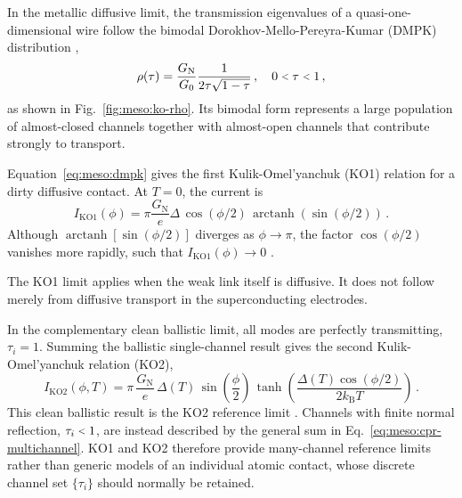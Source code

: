             In the metallic diffusive limit, the transmission eigenvalues of a quasi-one-dimensional wire follow the bimodal Dorokhov-Mello-Pereyra-Kumar (DMPK) distribution \cite{dorokhov_transmission_1982,beenakker_random-matrix_1997},
            \begin{equation}
                \rho(\tau) = \frac{G_\mathrm{N}}{G_0} \frac{1}{2\tau \sqrt{1-\tau}}\,,\quad 0\slt{}\tau\slt{}1\,,
                \label{eq:meso:dmpk}
            \end{equation}
            as shown in Fig.~\ref{fig:meso:ko-rho}. Its bimodal form represents a large population of almost-closed channels together with almost-open channels that contribute strongly to transport.

            Equation~\eqref{eq:meso:dmpk} gives the first Kulik-Omel'yanchuk (KO1) relation for a dirty diffusive contact. At $T=0$, the current is
            \begin{equation}
                I_\mathrm{KO1}(\phi) = \pi \frac{G_\mathrm{N}}{e}\Delta\,\cos\!\left(\phi/2\right)\,\operatorname{arctanh}\!\left(\sin\!\left(\phi/2\right)\right)\,.
            \end{equation}
            Although $\operatorname{arctanh}[\sin(\phi/2)]$ diverges as $\phi\to\pi$, the factor $\cos(\phi/2)$ vanishes more rapidly, such that $I_\mathrm{KO1}(\phi)\to0$ \cite{kulik_contribution_1975,golubov_current-phase_2004}.

            The KO1 limit applies when the weak link itself is diffusive. It does not follow merely from diffusive transport in the superconducting electrodes.

            In the complementary clean ballistic limit, all modes are perfectly transmitting, $\tau_i=1$. Summing the ballistic single-channel result gives the second Kulik-Omel'yanchuk relation (KO2),
            \begin{equation}
                I_\mathrm{KO2}(\phi, T) = \pi\,\frac{G_\mathrm{N}}{e}\,\Delta(T)\,\sin\!\left(\frac{\phi}{2}\right)\,
                    \tanh\!\left(\frac{\Delta(T)\cos\!\left(\phi/2\right)}{2k_\mathrm{B}T}\right)\,.
            \end{equation}
            This clean ballistic result is the KO2 reference limit \cite{kulik_contribution_1975,golubov_current-phase_2004}. Channels with finite normal reflection, $\tau_i\slt{}1$, are instead described by the general sum in Eq.~\eqref{eq:meso:cpr-multichannel}. KO1 and KO2 therefore provide many-channel reference limits rather than generic models of an individual atomic contact, whose discrete channel set $\{\tau_i\}$ should normally be retained.

